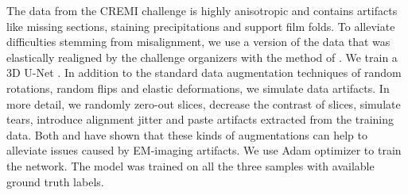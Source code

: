 The data from the CREMI challenge is highly anisotropic and contains artifacts like missing sections, staining precipitations and support film folds. 
To alleviate difficulties stemming from misalignment, we use a version of the data that was elastically realigned by the challenge organizers with the method of \cite{saalfeld2012elastic}.
We train a 3D U-Net \cite{ronneberger2015u, cciccek20163d} . In addition to the standard data augmentation techniques of random rotations, random flips and  elastic deformations, we simulate data artifacts.
In more detail, we randomly zero-out slices, decrease the contrast of slices, simulate tears, introduce alignment jitter and paste artifacts extracted from the training data. Both \cite{funke2018large} and \cite{lee2017superhuman} have shown
that these kinds of augmentations can help to alleviate issues caused by EM-imaging artifacts.
We use Adam optimizer to train the network. The model was trained on all the three samples with available ground truth labels.  

